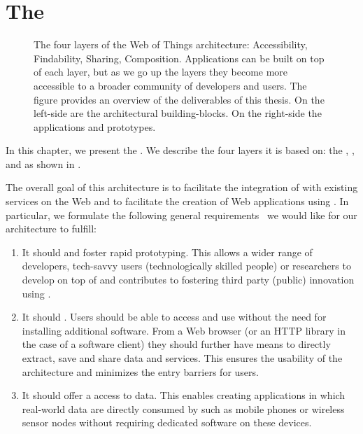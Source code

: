 \chapter{The \WoTLong{}}
\label{wot}
\minitoc

\begin{figure}
\centering 
\caption{The four layers of the Web of Things architecture: Accessibility, Findability, Sharing, Composition. Applications can be built on top of each layer, but as we go up the layers they become more accessible to a broader community of developers and users. The figure provides an overview of the deliverables of this thesis. On the left-side are the architectural building-blocks. On the right-side the applications and prototypes.}
\label{fig:wotArchi}
\end{figure}
In this chapter, we present the \WoTA{}. We describe the four layers it is based on: the \devLayer{}, \findLayer{}, \shareLayer{} and \compoLayer{} as shown in .

The overall goal of this architecture is to facilitate the integration of \sts{} with existing services on the Web and to facilitate the creation of Web applications using \sts{}. In particular, we formulate the following general requirements~\cite{Guinard2010-Search,Guinard2011} we would like for our architecture to fulfill:
 \begin{enumerate}
 \item It should  and foster rapid prototyping. This allows a wider range of developers, tech-savvy users (technologically skilled people) or researchers to develop on top of \sts{} and contributes to fostering third party (public) innovation using \sts{}.
 
  \item It should . Users should be able to access and use \sts{} without the need for installing additional software. From a Web browser (or an HTTP library in the case of a software client) they should further have means to directly extract, save and share \sts{} data and services. This ensures the usability of the architecture and minimizes the entry barriers for users.
 
 \item It should offer a  access to \sts{} data. This enables creating applications in which real-world data are directly consumed by  such as mobile phones or wireless sensor nodes without requiring dedicated software on these devices.
\end{enumerate} 

